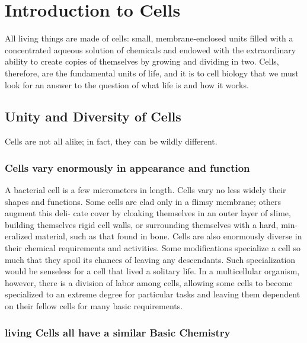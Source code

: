 \chapter{Introduction to Cells}

All living things are made of cells: small, membrane-enclosed units
filled with a concentrated aqueous solution of chemicals and endowed
with the extraordinary ability to create copies of themselves by growing
and dividing in two. 
Cells, therefore, are the fundamental units of life, and it is to cell biology
that we must look for an answer to the question of what life is and how it
works.

\section{Unity and Diversity of Cells}

Cells are not all alike; in fact, they can be wildly different.

\subsection{Cells vary enormously in appearance and function}

A bacterial cell is a few micrometers in length. Cells vary no less widely
their shapes and functions.
Some cells are clad only in a flimsy membrane; others augment this deli-
cate cover by cloaking themselves in an outer layer of slime, building
themselves rigid cell walls, or surrounding themselves with a hard, min-
eralized material, such as that found in bone.
Cells are also enormously diverse in their chemical requirements and
activities.
Some modifications specialize a cell so much that they spoil its chances
of leaving any descendants. Such specialization would be senseless for a
cell that lived a solitary life. In a multicellular organism, however, there is
a division of labor among cells, allowing some cells to become specialized
to an extreme degree for particular tasks and leaving them dependent on
their fellow cells for many basic requirements.

\subsection{living Cells all have a similar Basic Chemistry}

